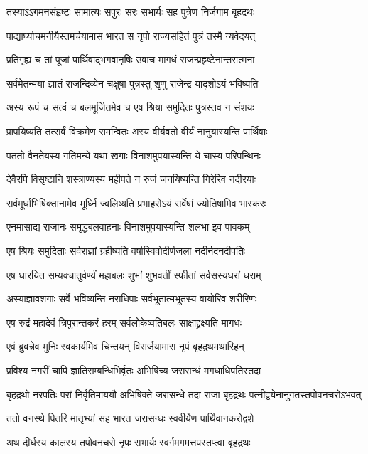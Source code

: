 \twolineshloka
{तस्याऽऽगमनसंहृष्टः सामात्यः सपुरः सरः}
{सभार्यः सह पुत्रेण निर्जगाम बृहद्रथः}


\twolineshloka
{पाद्यार्घ्याचमनीयैस्तमर्चयामास भारत}
{स नृपो राज्यसहितं पुत्रं तस्मै न्यवेदयत्}


\twolineshloka
{प्रतिगृह्य च तां पूजां पार्थिवाद्भगवानृषिः}
{उवाच मागधं राजन्प्रहृष्टेनान्तरात्मना}


\twolineshloka
{सर्वमेतन्मया ज्ञातं राजन्दिव्येन चक्षुषा}
{पुत्रस्तु शृणु राजेन्द्र यादृशोऽयं भविष्यति}


\twolineshloka
{अस्य रूपं च सत्वं च बलमूर्जितमेव च}
{एष श्रिया समुदितः पुत्रस्तव न संशयः}


\twolineshloka
{प्रापयिष्यति तत्सर्वं विक्रमेण समन्वितः}
{अस्य वीर्यवतो वीर्यं नानुयास्यन्ति पार्थिवाः}


\twolineshloka
{पततो वैनतेयस्य गतिमन्ये यथा खगाः}
{विनाशमुपयास्यन्ति ये चास्य परिपन्थिनः}


\twolineshloka
{देवैरपि विसृष्टानि शस्त्राण्यस्य महीपते}
{न रुजं जनयिष्यन्ति गिरेरिव नदीरयाः}


\twolineshloka
{सर्वमूर्धाभिषिक्तानामेव मूर्ध्नि ज्वलिष्यति}
{प्रभाहरोऽयं सर्वेषां ज्योतिषामिव भास्करः}


\twolineshloka
{एनमासाद्य राजानः समृद्धबलवाहनाः}
{विनाशमुपयास्यन्ति शलभा इव पावकम्}


\twolineshloka
{एष श्रियः समुदिताः सर्वराज्ञां ग्रहीष्यति}
{वर्षास्विवोदीर्णजला नदीर्नदनदीपतिः}


\twolineshloka
{एष धारयित सम्यक्चातुर्वर्ण्यं महाबलः}
{शुभां शुभवतीं स्फीतां सर्वसस्यधरां धराम्}


\twolineshloka
{अस्याज्ञावशगाः सर्वे भविष्यन्ति नराधिपाः}
{सर्वभूतात्मभूतस्य वायोरिव शरीरिणः}


\twolineshloka
{एष रुद्रं महादेवं त्रिपुरान्तकरं हरम्}
{सर्वलोकेष्वतिबलः साक्षाद्द्रक्ष्यति मागधः}


\twolineshloka
{एवं ब्रुवन्नेव मुनिः स्वकार्यमिव चिन्तयन्}
{विसर्जयामास नृपं बृहद्रथमथारिहन्}


\twolineshloka
{प्रविश्य नगरीं चापि ज्ञातिसम्बन्धिभिर्वृतः}
{अभिषिच्य जरासन्धं मगधाधिपतिस्तदा}


\threelineshloka
{बृहद्रथो नरपतिः परां निर्वृतिमाययौ}
{अभिषिक्ते जरासन्धे तदा राजा बृहद्रथः}
{पत्नीद्वयेनानुगतस्तपोवनचरोऽभवत्}


\twolineshloka
{ततो वनस्थे पितरि मातृभ्यां सह भारत}
{जरासन्धः स्ववीर्येण पार्थिवानकरोद्वशे}


\twolineshloka
{अथ दीर्घस्य कालस्य तपोवनचरो नृपः}
{सभार्यः स्वर्गमगमत्तपस्तप्त्वा बृहद्रथः}


